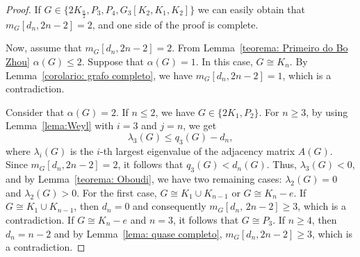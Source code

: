 \documentclass[preprint,12pt]{elsarticle}
\begin{document}
\begin{proof}
If $
G \in \{ 2K_{\frac{n}{2}}, P_3, P_4, G_3[K_2, K_1, K_2]\}$ we can easily obtain that\linebreak \( m_G [d_n, 2n-2] = 2 \), and one side of the proof is complete. 

Now, assume that \( m_G [d_n, 2n-2] = 2 \). From Lemma~\ref{teorema: Primeiro do Bo Zhou} $\alpha(G) \leq 2$. Suppose that $\alpha(G) = 1$. In this case, $G \cong K_n$. By Lemma~\ref{corolario: grafo completo}, we have $m_G[d_n, 2n-2] = 1$, which is a contradiction. 

Consider that $\alpha(G) = 2$. If \( n \leq 2 \), we have \( G \in \{2K_1, P_2\} \). For \( n \geq 3 \), by using Lemma~\ref{lema:Weyl} with $i = 3$ and $j = n$, we get 
\[
\lambda_3(G) \leq q_3(G) - d_n,
\]
where $\lambda_i(G)$ is the $i$-th largest eigenvalue of the adjacency matrix $A(G).$
%
%
%
Since \( m_G [d_n, 2n-2] = 2 \), it follows that \( q_3(G) < d_n(G) \). Thus, \( \lambda_{3}(G) < 0 \), and by Lemma~\ref{teorema: Oboudi}, we have two remaining cases: $\lambda _2(G) = 0$ and $\lambda _2(G) > 0$. For the first case, $G \cong K_1 \cup K_{n-1}$ or $G \cong K_n - e$. If $G \cong K_1 \cup K_{n-1}$, then $d_n = 0$ and consequently $m_G[d_n,\,2n-2] \geq 3$, which is a contradiction. If $G \cong K_n - e$ and $n = 3$, it follows that $G \cong P_3$. If $n \geq 4$, then $d_n = n-2$ and by Lemma~\ref{lema: quase completo}, $m_G[d_n, 2n-2] \geq 3$, which is a contradiction. 


\end{proof}
\end{document}
